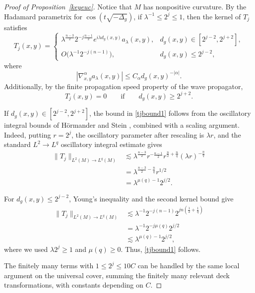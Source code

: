 \documentclass[11pt]{amsart}
\newcommand{\la}{\lambda}
\begin{document}
\begin{proof}[Proof of Proposition~\ref{keyeuc}]
Notice that $M$ has nonpositive curvature. By the Hadamard parametrix
for $\cos(t\sqrt{-\Delta_g})$, if $\la^{-1}\leq2^j\leq1$, then the
kernel of $T_j$ satisfies
\begin{equation}
T_j(x,y)
=
\begin{cases}
\la^{\frac{n-3}{2}}
2^{-j\frac{n-1}{2}}
e^{i\la d_g(x,y)}a_\la(x,y),
&
d_g(x,y)\in[2^{j-2},2^{j+2}],
\\
O\bigl(\la^{-1}2^{-j(n-1)}\bigr),
&
d_g(x,y)\leq2^{j-2},
\end{cases}
\end{equation}
where
\[
|\nabla_{x,y}^{\alpha}a_\la(x,y)|
\leq
C_\alpha d_g(x,y)^{-|\alpha|}.
\]
Additionally, by the finite propagation speed property of the wave
propagator,
\[
T_j(x,y)=0
\qquad\text{if}\qquad
d_g(x,y)\geq2^{j+2}.
\]

If
$d_g(x,y)\in[2^{j-2},2^{j+2}]$, the bound in
\eqref{tjbound1} follows from the oscillatory integral bounds of
H\"ormander \cite{HormanderIII} and Stein \cite{Stein}, combined
with a scaling argument. Indeed, putting $r=2^j$, the oscillatory
parameter after rescaling is $\la r$, and the standard
$L^2\to L^q$ oscillatory integral estimate gives
\begin{align*}
\|T_j\|_{L^2(M)\to L^q(M)}
&\lesssim
\la^{\frac{n-3}{2}}
r^{-\frac{n-1}{2}}
r^{\frac n2+\frac nq}
(\la r)^{-\frac nq}
\\
&=
\la^{\frac{n-3}{2}-\frac nq}r^{1/2}
\\
&=
\la^{\mu(q)-1}2^{j/2}.
\end{align*}

For $d_g(x,y)\leq2^{j-2}$, Young's inequality and the second
kernel bound give
\begin{align*}
\|T_j\|_{L^2(M)\to L^q(M)}
&\lesssim
\la^{-1}
2^{-j(n-1)}
2^{jn(\frac12+\frac1q)}
\\
&=
\la^{-1}
2^{-j\mu(q)}
2^{j/2}
\\
&\lesssim
\la^{\mu(q)-1}2^{j/2},
\end{align*}
where we used $\la2^j\geq1$ and $\mu(q)\geq0$.
Thus, \eqref{tjbound1} follows.

The finitely many terms with $1\leq2^j\leq10C$ can be handled by
the same local argument on the universal cover, summing the finitely many relevant deck transformations, with constants depending on $C$.


\end{proof}
\end{document}
